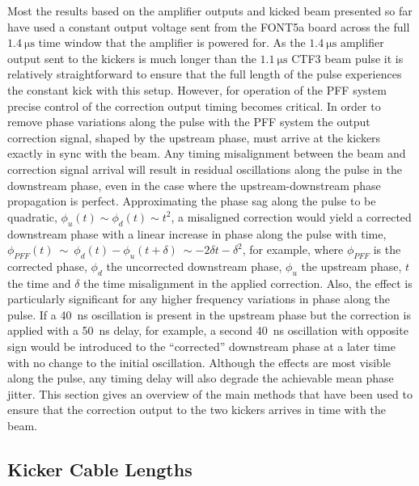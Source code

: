 
Most the results based on the amplifier outputs and kicked beam presented so far have used a constant output voltage sent from the FONT5a board across the full \(1.4~\mathrm{\mu s}\) time window that the amplifier is powered for. As the \(1.4~\mathrm{\mu s}\) amplifier output sent to the kickers is much longer than the \(1.1~\mathrm{\mu s}\) CTF3 beam pulse it is relatively straightforward to ensure that the full length of the pulse experiences the constant kick with this setup. However, for operation of the PFF system precise control of the correction output timing becomes critical. In order to remove phase variations along the pulse with the PFF system the output correction signal, shaped by the upstream phase, must arrive at the kickers exactly in sync with the beam. Any timing misalignment between the beam and correction signal arrival will result in residual oscillations along the pulse in the downstream phase, even in the case where the upstream-downstream phase propagation is perfect. Approximating the phase sag along the pulse to be quadratic, \(\phi_{u}(t) \sim \phi_{d}(t) \sim t^2\), a misaligned correction would yield a corrected downstream phase with a linear increase in phase along the pulse with time, \(\phi_{PFF}(t)~\sim~\phi_d(t)-\phi_u(t+\delta)~\sim -2\delta t - \delta^2\), for example, where \(\phi_{PFF}\) is the corrected phase, \(\phi_{d}\) the uncorrected downstream phase, \(\phi_{u}\) the upstream phase, \(t\) the time and \(\delta\) the time misalignment in the applied correction. Also, the effect is particularly significant for any higher frequency variations in phase along the pulse. If a 40~ns oscillation is present in the upstream phase but the correction is applied with a 50~ns delay, for example, a second 40~ns oscillation with opposite sign would be introduced to the ``corrected'' downstream phase at a later time with no change to the initial oscillation. Although the effects are most visible along the pulse, any timing delay will also degrade the achievable mean phase jitter. This section gives an overview of the main methods that have been used to ensure that the correction output to the two kickers arrives in time with the beam. 

\subsection{Kicker Cable Lengths}
\label{ss:kickerCables}

